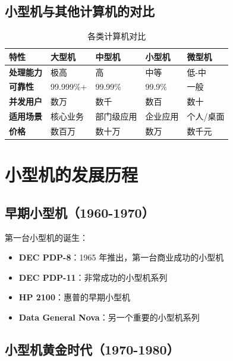 \documentclass[12pt,UTF8]{ctexbook}
\begin{document}
\section{小型机与其他计算机的对比}

\begin{table}[htbp]
    \centering
    \caption{各类计算机对比}
    \begin{tabular}{|p{2cm}|p{2cm}|p{2cm}|p{2cm}|p{2cm}|}
        \hline
        \textbf{特性} & \textbf{大型机} & \textbf{中型机} & \textbf{小型机} & \textbf{微型机} \\
        \hline
        \textbf{处理能力} & 极高 & 高 & 中等 & 低-中 \\
        \hline
        \textbf{可靠性} & 99.999\%+ & 99.99\% & 99.9\% & 一般 \\
        \hline
        \textbf{并发用户} & 数万 & 数千 & 数百 & 数十 \\
        \hline
        \textbf{适用场景} & 核心业务 & 部门级应用 & 企业应用 & 个人/桌面 \\
        \hline
        \textbf{价格} & 数百万 & 数十万 & 数万 & 数千元 \\
        \hline
    \end{tabular}
\end{table}

\chapter{小型机的发展历程}
\label{chap:history}

\section{早期小型机（1960-1970）}

第一台小型机的诞生：

\begin{itemize}[leftmargin=2cm]
    \item \textbf{DEC PDP-8}：1965 年推出，第一台商业成功的小型机
    \item \textbf{DEC PDP-11}：非常成功的小型机系列
    \item \textbf{HP 2100}：惠普的早期小型机
    \item \textbf{Data General Nova}：另一个重要的小型机系列
\end{itemize}

\section{小型机黄金时代（1970-1980）}
\end{document}
